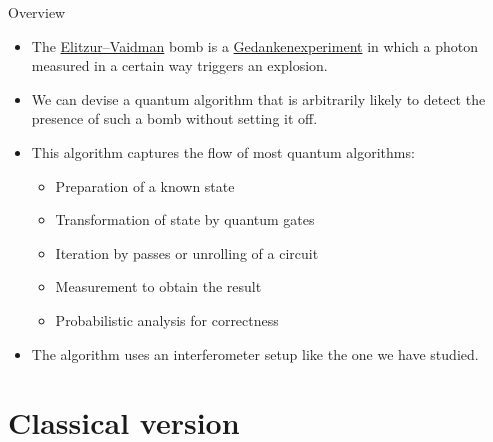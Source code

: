 
\begin{frame}{Overview}

\begin{itemize}
    \item The \href{https://en.wikipedia.org/wiki/Elitzur-Vaidman_bomb_tester}{Elitzur--Vaidman} bomb is a \href{https://en.wikipedia.org/wiki/Thought_experiment}{Gedankenexperiment} in which a photon measured in a certain way triggers an explosion.
    \item We can devise a quantum algorithm that is arbitrarily likely to detect the presence of such a bomb without setting it off.
    \item This algorithm captures the flow of most quantum algorithms:
    \begin{itemize}
        \item Preparation of a known state
        \item Transformation of state by quantum gates
        \item Iteration by passes or unrolling of a circuit
        \item Measurement to obtain the result
        \item Probabilistic analysis for correctness
    \end{itemize}
    \item The algorithm uses an interferometer setup like the one we have studied.
\end{itemize}
    
\end{frame}

\section*{Classical version}

